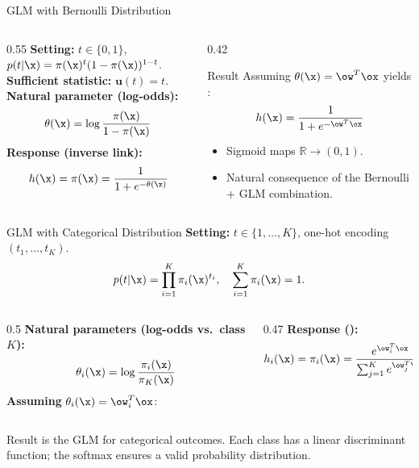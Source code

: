 \begin{frame}{GLM with Bernoulli Distribution}
  \begin{columns}[T]
    \begin{column}{0.55\textwidth}
      \textbf{Setting:} $t \in \{0,1\}$, $p(t|\x) = \pi(\x)^t(1-\pi(\x))^{1-t}$.\\[0.4em]
      \textbf{Sufficient statistic:} $\mathbf{u}(t) = t$.\\[0.4em]
      \textbf{Natural parameter (log-odds):}
      \[
        \theta(\x) = \log\frac{\pi(\x)}{1-\pi(\x)}
      \]
      \textbf{Response (inverse link):}
      \[
        h(\x) = \pi(\x) = \frac{1}{1+e^{-\theta(\x)}}
      \]
    \end{column}
    \begin{column}{0.42\textwidth}
      \begin{block}{Result}
        Assuming $\theta(\x) = \ow^T\ox$ yields :
        \[
          h(\x) = \frac{1}{1+e^{-\ow^T\ox}}
        \]
      \end{block}
      \begin{itemize}
        \item Sigmoid maps $\mathbb{R} \to (0,1)$.
        \item Natural consequence of the Bernoulli + GLM combination.
      \end{itemize}
    \end{column}
  \end{columns}
\end{frame}

\begin{frame}{GLM with Categorical Distribution}
  \textbf{Setting:} $t \in \{1,\ldots,K\}$, one-hot encoding $(t_1,\ldots,t_K)$.
  \[
    p(t|\x) = \prod_{i=1}^K \pi_i(\x)^{t_i}, \quad \sum_{i=1}^K\pi_i(\x) = 1.
  \]
  \begin{columns}[T]
    \begin{column}{0.5\textwidth}
      \textbf{Natural parameters (log-odds vs.\ class $K$):}
      \[
        \theta_i(\x) = \log\frac{\pi_i(\x)}{\pi_K(\x)}
      \]
      \textbf{Assuming} $\theta_i(\x) = \ow_i^T\ox$:
    \end{column}
    \begin{column}{0.47\textwidth}
      \textbf{Response ():}
      \[
        h_i(\x) = \pi_i(\x) = \frac{e^{\ow_i^T\ox}}{\sum_{j=1}^K e^{\ow_j^T\ox}}
      \]
    \end{column}
  \end{columns}
  \vspace{0.3cm}
  \begin{block}{Result}
     is the GLM for categorical outcomes. Each class has a linear discriminant function; the softmax ensures a valid probability distribution.
  \end{block}
\end{frame}

